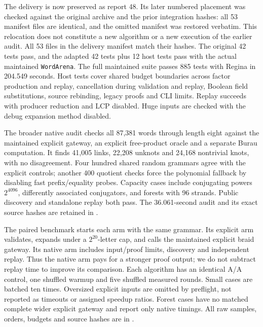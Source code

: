 The delivery is now preserved as report 48. Its later numbered placement
was checked against the original archive and the prior integration hashes:
all 53 manifest files are identical, and the omitted manifest was restored
verbatim. This relocation does not constitute a new algorithm or a new
execution of the earlier audit. All 53 files in the delivery manifest match their hashes. The original 42
tests pass, and the adapted 42 tests plus 12 host tests pass with the actual
maintained \texttt{WordArena}. The full maintained suite passes 885 tests with
Regina in 204.549 seconds. Host tests cover shared budget boundaries across
factor production and replay, cancellation during validation and replay,
Boolean field substitutions, source rebinding, legacy proofs and CLI limits.
Replay succeeds with producer reduction and LCP disabled. Huge inputs are
checked with the debug expansion method disabled.

The broader native audit checks all 87,381 words through length eight against
the maintained explicit gateway, an explicit free-product oracle and a separate
Burau computation. It finds 41,005 links, 22,208 unknots and 24,168 nontrivial
knots, with no disagreement. Four hundred shared random grammars agree with
the explicit controls; another 400 quotient checks force the polynomial
fallback by disabling fast prefix/equality probes. Capacity cases include
conjugating powers $2^{4096}$, differently associated conjugators, and forests
with 96 strands. Public discovery and standalone replay both pass. The
36.061-second audit and its exact source hashes are retained in
.



The paired benchmark starts each arm with the same grammar. Its explicit
arm validates, expands under a $2^{20}$-letter cap, and calls the maintained
explicit braid gateway. Its native arm includes input/proof limits, discovery
and independent replay. Thus the native arm pays for a stronger proof output;
we do not subtract replay time to improve its comparison. Each algorithm has
an identical A/A control, one shuffled warmup and five shuffled measured
rounds. Small cases are batched ten times. Oversized explicit inputs are
omitted by preflight, not reported as timeouts or assigned speedup ratios.
Forest cases have no matched complete wider explicit gateway and report only
native timings. All raw samples, orders, budgets and source hashes are in
.


